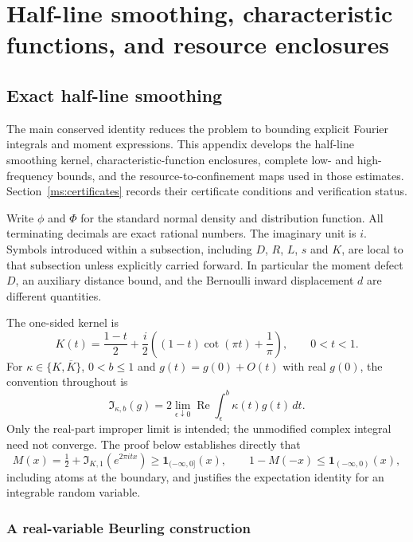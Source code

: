 \section{Half-line smoothing, characteristic functions, and resource enclosures}
\label{ms:fourier:appendix}

\subsection{Exact half-line smoothing}
\label{ms:fourier:kernel}

The main conserved identity reduces the problem to bounding explicit
Fourier integrals and moment expressions. This appendix develops the
half-line smoothing kernel, characteristic-function enclosures, complete
low- and high-frequency bounds, and the resource-to-confinement maps
used in those estimates. Section~\ref{ms:certificates} records their
certificate conditions and verification status.

Write $\phi$ and $\Phi$ for the standard normal density and distribution
function. All terminating decimals are exact rational numbers. The
imaginary unit is $i$. Symbols introduced within a subsection, including
$D$, $R$, $L$, $s$ and $K$, are local to that subsection unless explicitly
carried forward. In particular the moment defect $D$, an auxiliary distance
bound, and the Bernoulli inward displacement $d$ are different quantities.

The one-sided kernel is
\[
 K(t)=\frac{1-t}{2}+\frac{i}{2}
       \left((1-t)\cot(\pi t)+\frac1\pi\right),\qquad 0<t<1.
\]
For $\kappa\in\{K,\overline K\}$, $0<b\le1$ and
$g(t)=g(0)+O(t)$ with real $g(0)$, the convention throughout is
\begin{equation}\label{ms:fourier:kernel-convention}
 \mathfrak I_{\kappa,b}(g)
 =2\lim_{\epsilon\downarrow0}\operatorname{Re}
       \int_\epsilon^b\kappa(t)g(t)\,dt.
\end{equation}
Only the real-part improper limit is intended; the unmodified complex
integral need not converge. The proof below establishes directly that
\[
 M(x)=\tfrac12+\mathfrak I_{K,1}(e^{2\pi itx})
       \ge\mathbf1_{(-\infty,0]}(x),\qquad
 1-M(-x)\le\mathbf1_{(-\infty,0)}(x),
\]
including atoms at the boundary, and justifies the expectation identity
for an integrable random variable.

\subsubsection{A real-variable Beurling construction}

